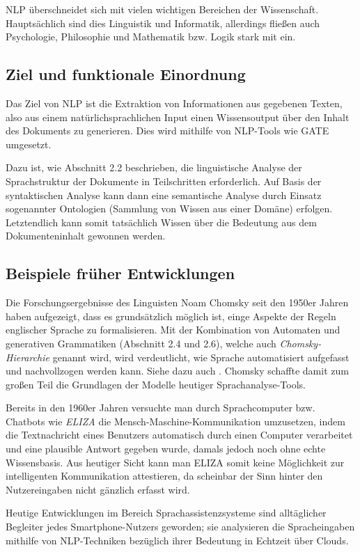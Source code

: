 \documentclass[12pt]{report}
\begin{document}
NLP überschneidet sich mit vielen wichtigen Bereichen der Wissenschaft. Hauptsächlich sind dies Linguistik und Informatik, allerdings fließen auch Psychologie, Philosophie und Mathematik bzw. Logik stark mit ein. 

\subsection{Ziel und funktionale Einordnung}
Das Ziel von NLP ist die Extraktion von Informationen aus gegebenen Texten, also aus einem natürlichsprachlichen Input einen Wissensoutput über den Inhalt des Dokuments zu generieren. Dies wird mithilfe von NLP-Tools wie GATE umgesetzt.

Dazu ist, wie Abschnitt 2.2 beschrieben, die linguistische Analyse der Sprachstruktur der Dokumente in Teilschritten erforderlich. Auf Basis der syntaktischen Analyse kann dann eine semantische Analyse durch Einsatz sogenannter Ontologien (Sammlung von Wissen aus einer Domäne) erfolgen. Letztendlich kann somit tatsächlich Wissen über die Bedeutung aus dem Dokumenteninhalt gewonnen werden.

\subsection{Beispiele früher Entwicklungen}
Die Forschungsergebnisse des Linguisten Noam Chomsky seit den 1950er Jahren haben aufgezeigt, dass es grundsätzlich möglich ist, einge Aspekte der Regeln englischer Sprache zu formalisieren. Mit der Kombination von Automaten und generativen Grammatiken (Abschnitt 2.4 und 2.6), welche auch \textit{Chomsky-Hierarchie} genannt wird, wird verdeutlicht, wie Sprache automatisiert aufgefasst und nachvollzogen werden kann. Siehe dazu auch \cite{cho57}. Chomsky schaffte damit zum großen Teil die Grundlagen der Modelle heutiger Sprachanalyse-Tools.

Bereits in den 1960er Jahren versuchte man durch Sprachcomputer bzw. Chatbots wie \textit{ELIZA} \cite{wei66} die Mensch-Maschine-Kommunikation umzusetzen, indem die Textnachricht eines Benutzers automatisch durch einen Computer verarbeitet und eine plausible Antwort gegeben wurde, damals jedoch noch ohne echte Wissensbasis. Aus heutiger Sicht kann man ELIZA somit keine Möglichkeit zur \glqq   intelligenten\grqq{} Kommunikation attestieren, da scheinbar der Sinn hinter den Nutzereingaben nicht gänzlich erfasst wird.

Heutige Entwicklungen im Bereich Sprachassistenzsysteme sind alltäglicher Begleiter jedes Smartphone-Nutzers geworden; sie analysieren die Spracheingaben mithilfe von NLP-Techniken bezüglich ihrer Bedeutung in Echtzeit über Clouds. \cite{hao14}
\end{document}
